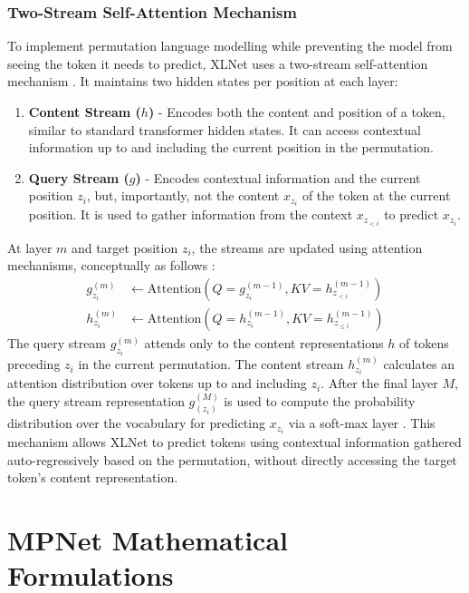 \documentclass[10pt,oneside]{report}
\begin{document}
\subsubsection*{Two-Stream Self-Attention Mechanism}
To implement permutation language modelling while preventing the model from seeing the token it needs to predict, XLNet uses a two-stream self-attention mechanism \cite{vaswani2017attention, yang2019xlnet}. It maintains two hidden states per position at each layer:
\begin{enumerate}
    \item \textbf{Content Stream ($h$)} - Encodes both the content and position of a token, similar to standard transformer hidden states. It can access contextual information up to and including the current position in the permutation.
    \item \textbf{Query Stream ($g$)} - Encodes contextual information and the current position $z_i$, but, importantly, not the content $x_{z_i}$ of the token at the current position. It is used to gather information from the context $x_{z_{<i}}$ to predict $x_{z_i}$.
\end{enumerate}
At layer $m$ and target position $z_i$, the streams are updated using attention mechanisms, conceptually as follows \cite{vaswani2017attention, yang2019xlnet}:
\begin{align}
    g_{z_i}^{(m)} &\leftarrow \text{Attention} (Q = g_{z_i}^{(m - 1)}, KV = h_{z_{<i}}^{(m - 1)}) \label{eq:xlnet_g_update_appendix} \\ %
    h_{z_i}^{(m)} &\leftarrow \text{Attention} (Q = h_{z_i}^{(m - 1)}, KV = h_{z_{\le i}}^{(m - 1)}) \label{eq:xlnet_h_update_appendix} %
\end{align}
The query stream $g_{z_i}^{(m)}$ attends only to the content representations $h$ of tokens preceding $z_i$ in the current permutation. The content stream $h_{z_i}^{(m)}$ calculates an attention distribution over tokens up to and including $z_i$. After the final layer $M$, the query stream representation $g_{(z_i)}^{(M)}$ is used to compute the probability distribution over the vocabulary for predicting $x_{z_i}$ via a soft-max layer \cite{gao2017properties, yang2019xlnet}. This mechanism allows XLNet to predict tokens using contextual information gathered auto-regressively based on the permutation, without directly accessing the target token's content representation.

\section{MPNet Mathematical Formulations} \label{app:mpnet_maths}
\end{document}

